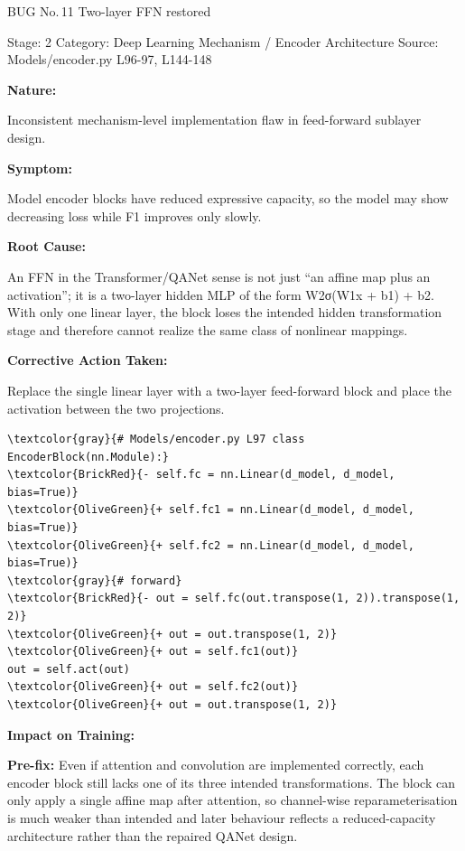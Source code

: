\documentclass[10pt]{article}
\newcommand{\FieldLabel}[1]{%
 {\bfseries #1:}\par
}
\begin{document}
\begin{bugbox}{BUG No.\,11 \quad Two-layer FFN restored}
{\color{MetaGray}\small Stage: 2 \;\textbar\; Category: Deep Learning Mechanism / Encoder Architecture \;\textbar\; Source: Models/encoder.py L96-97, L144-148\par}
\vspace{0.22em}
\FieldLabel{Nature}
Inconsistent mechanism-level implementation flaw in feed-forward sublayer design.
\par
\vspace{0.35em}
\FieldLabel{Symptom}
Model encoder blocks have reduced expressive capacity, so the model may show decreasing loss while F1 improves only slowly.
\par
\vspace{0.35em}
\FieldLabel{Root Cause}
An FFN in the Transformer/QANet sense is not just ``an affine map plus an activation''; it is a two-layer hidden MLP of the form W2σ(W1x + b1) + b2. With only one linear layer, the block loses the intended hidden transformation stage and therefore cannot realize the same class of nonlinear mappings.
\par
\vspace{0.35em}
\FieldLabel{Corrective Action Taken}
Replace the single linear layer with a two-layer feed-forward block and place the activation between the two projections.
\par
\vspace{0.35em}
\begin{Verbatim}[commandchars=\\\{\},fontsize=\footnotesize,breaklines=true,breaksymbol={},frame=leftline,framerule=2pt,rulecolor=\color{gray!40},xleftmargin=6pt,formatcom=\singlespacing]
\textcolor{gray}{# Models/encoder.py L97 class EncoderBlock(nn.Module):}
\textcolor{BrickRed}{- self.fc = nn.Linear(d_model, d_model, bias=True)}
\textcolor{OliveGreen}{+ self.fc1 = nn.Linear(d_model, d_model, bias=True)}
\textcolor{OliveGreen}{+ self.fc2 = nn.Linear(d_model, d_model, bias=True)}
\textcolor{gray}{# forward}
\textcolor{BrickRed}{- out = self.fc(out.transpose(1, 2)).transpose(1, 2)}
\textcolor{OliveGreen}{+ out = out.transpose(1, 2)}
\textcolor{OliveGreen}{+ out = self.fc1(out)}
out = self.act(out)
\textcolor{OliveGreen}{+ out = self.fc2(out)}
\textcolor{OliveGreen}{+ out = out.transpose(1, 2)}
\end{Verbatim}
\vspace{0.22em}
\FieldLabel{Impact on Training}
\textbf{Pre-fix:} Even if attention and convolution are implemented correctly, each encoder block still lacks one of its three intended transformations. The block can only apply a single affine map after attention, so channel-wise reparameterisation is much weaker than intended and later behaviour reflects a reduced-capacity architecture rather than the repaired QANet design.\par\smallskip

\end{bugbox}
\end{document}
